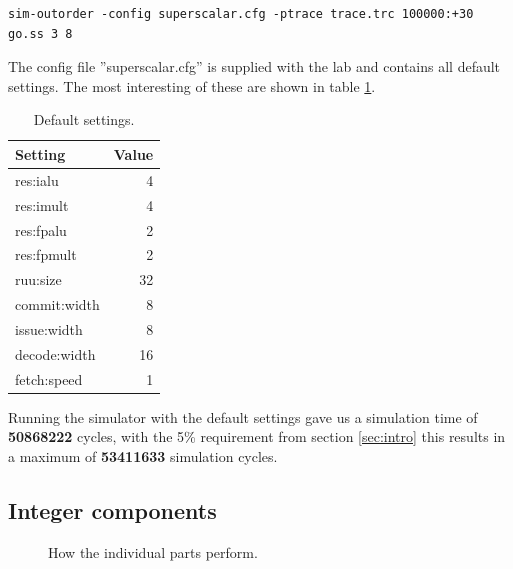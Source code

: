 \documentclass[titlepage, a4paper]{article}
\begin{document}
\begin{lstlisting}[caption=Simulator command., label=sim:simcom, breaklines=true]
sim-outorder -config superscalar.cfg -ptrace trace.trc 100000:+30 go.ss 3 8
\end{lstlisting}

The config file ''superscalar.cfg'' is supplied with the lab and contains all default settings. The most interesting of these are shown in table \ref{tab:default}.

\begin{table}[H]
\centering
\caption{Default settings.}

\begin{tabular}{|l|r|}
  \hline
  \textbf{Setting} & \textbf{Value} \\ \hline
  res:ialu & 4 \\ \hline
  res:imult & 4 \\ \hline
  res:fpalu & 2 \\ \hline
  res:fpmult & 2 \\ \hline
  ruu:size & 32 \\ \hline
  commit:width & 8 \\ \hline
  issue:width & 8 \\ \hline
  decode:width & 16 \\ \hline
  fetch:speed & 1 \\ \hline
\end{tabular}

\label{tab:default}
\end{table}

Running the simulator with the default settings gave us a simulation time of \textbf{50868222} cycles, with the 5\% requirement from section \ref{sec:intro} this results in a maximum of \textbf{53411633} simulation cycles.

\subsection{Integer components}
\begin{figure}[H]
  \centering
  \caption{How the individual parts perform.}
  \label{fig:performance}
\end{figure}
\end{document}
